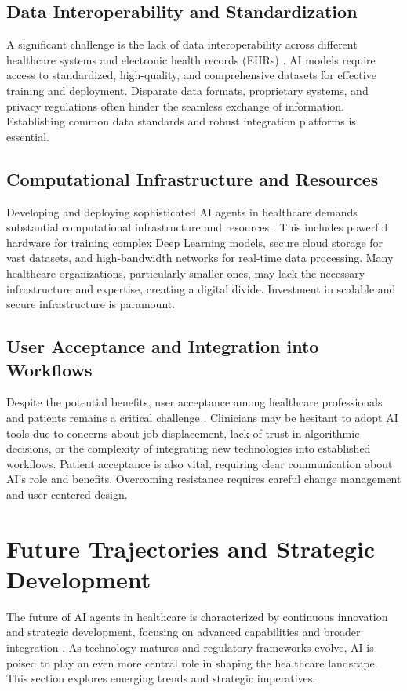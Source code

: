\documentclass[12pt,a4paper]{article}
\begin{document}
\subsection{Data Interoperability and Standardization}
A significant challenge is the lack of data interoperability across different healthcare systems and electronic health records (EHRs) \cite{alation_data_catalog}. AI models require access to standardized, high-quality, and comprehensive datasets for effective training and deployment. Disparate data formats, proprietary systems, and privacy regulations often hinder the seamless exchange of information. Establishing common data standards and robust integration platforms is essential.

\subsection{Computational Infrastructure and Resources}
Developing and deploying sophisticated AI agents in healthcare demands substantial computational infrastructure and resources \cite{oracle_cloud}. This includes powerful hardware for training complex Deep Learning models, secure cloud storage for vast datasets, and high-bandwidth networks for real-time data processing. Many healthcare organizations, particularly smaller ones, may lack the necessary infrastructure and expertise, creating a digital divide. Investment in scalable and secure infrastructure is paramount.

\subsection{User Acceptance and Integration into Workflows}
Despite the potential benefits, user acceptance among healthcare professionals and patients remains a critical challenge \cite{nih_patient_satisfaction}. Clinicians may be hesitant to adopt AI tools due to concerns about job displacement, lack of trust in algorithmic decisions, or the complexity of integrating new technologies into established workflows. Patient acceptance is also vital, requiring clear communication about AI's role and benefits. Overcoming resistance requires careful change management and user-centered design.

\section{Future Trajectories and Strategic Development}
The future of AI agents in healthcare is characterized by continuous innovation and strategic development, focusing on advanced capabilities and broader integration \cite{ey_global_regulatory}. As technology matures and regulatory frameworks evolve, AI is poised to play an even more central role in shaping the healthcare landscape. This section explores emerging trends and strategic imperatives.
\end{document}
